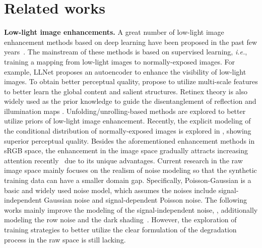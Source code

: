 \documentclass[10pt,twocolumn,letterpaper]{article}
\def\ie{\textit{i.e.}}
\newcommand{\para}[1]{\noindent\textbf{#1}}
\begin{document}
\section{Related works}
\para{Low-light image enhancements.} A great number of low-light image enhancement methods based on deep learning have been proposed in the past few years~\cite{zhang2021rellie, huang2022deep, wang2022ultra, guo2022low, xu2022snr, jin2022unsupervised, jin2023enhancing}. The mainstream of these methods is based on supervised learning, \ie, training a mapping from low-light images to normally-exposed images. For example, LLNet \cite{lore2017llnet} proposes an autoencoder to enhance the visibility of low-light images. To obtain better perceptual quality, \cite{shen2017msr, tao2017llcnn, lv2018mbllen, ren2019low} propose to utilize multi-scale features to better learn the global content and salient structures. Retinex theory is also widely used as the prior knowledge to guide the disentanglement of reflection and illumination maps \cite{wei2018deep, wang2019progressive, wei2018deep, guo2022enhancing}. Unfolding/unrolling-based methods \cite{liu2021ruas, zheng2021adaptive, wu2022uretinex} are explored to better utilize priors of low-light image enhancement. Recently, the explicit modeling of the conditional distribution of normally-exposed images is explored in \cite{wang2021low}, showing superior perceptual quality. Besides the aforementioned enhancement methods in sRGB space, the enhancement in the image space gradually attracts increasing attention recently~\cite{huang2022towards, chen2018learning, punnappurath2022day, dong2022abandoning} due to its unique advantages. Current research in the raw image space mainly focuses on the realism of noise modeling \cite{wei2020physics, zhang2021rethinking, feng2022learnability, jiniccv23led, wang2023raw, wang2023beyond} so that the synthetic training data can have a smaller domain gap. Specifically, Poisson-Gaussian \cite{foi2008practical} is a basic and widely used noise model, which assumes the noises include signal-independent Gaussian noise and signal-dependent Poisson noise. The following works mainly improve the modeling of the signal-independent noise, \eg, additionally modeling the row noise \cite{wei2020physics} and the dark shading~\cite{feng2022learnability}. However, the exploration of training strategies to better utilize the clear formulation of the degradation process in the raw space is still lacking.
\end{document}
